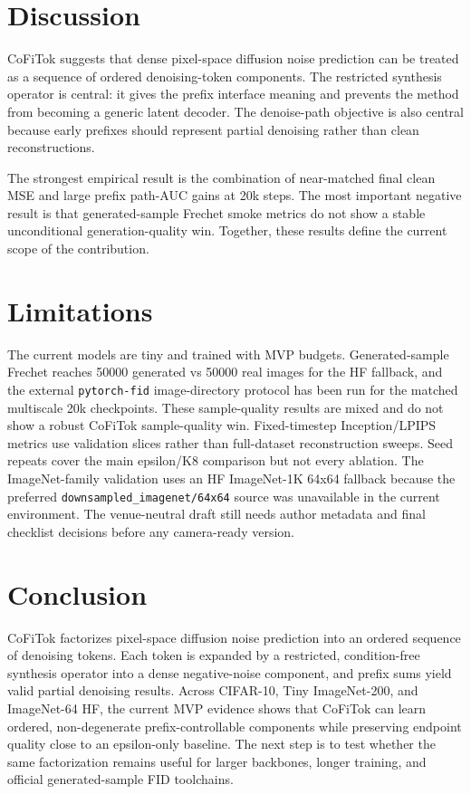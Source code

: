 \documentclass[11pt]{article}
\newcommand{\method}{CoFiTok}
\begin{document}
\section{Discussion}

\method{} suggests that dense pixel-space diffusion noise prediction can be
treated as a sequence of ordered denoising-token components. The restricted
synthesis operator is central: it gives the prefix interface meaning and
prevents the method from becoming a generic latent decoder. The denoise-path
objective is also central because early prefixes should represent partial
denoising rather than clean reconstructions.

The strongest empirical result is the combination of near-matched final clean
MSE and large prefix path-AUC gains at 20k steps. The most important negative
result is that generated-sample Frechet smoke metrics do not show a stable
unconditional generation-quality win. Together, these results define the
current scope of the contribution.

\section{Limitations}

The current models are tiny and trained with MVP budgets. Generated-sample
Frechet reaches 50000 generated vs 50000 real images for the HF fallback, and
the external \texttt{pytorch-fid} image-directory protocol has been run for the
matched multiscale 20k checkpoints. These sample-quality results are mixed and
do not show a robust \method{} sample-quality win. Fixed-timestep
Inception/LPIPS metrics use validation slices rather than full-dataset
reconstruction sweeps. Seed repeats cover the main epsilon/K8 comparison but
not every ablation. The ImageNet-family validation uses an HF ImageNet-1K 64x64
fallback because the preferred \texttt{downsampled\_imagenet/64x64} source was
unavailable in the current environment. The venue-neutral draft still needs
author metadata and final checklist decisions before any camera-ready version.

\section{Conclusion}

\method{} factorizes pixel-space diffusion noise prediction into an ordered
  sequence of denoising tokens. Each token is expanded by a restricted,
condition-free synthesis operator into a dense negative-noise component, and
prefix sums yield valid partial denoising results. Across CIFAR-10, Tiny
ImageNet-200, and ImageNet-64 HF, the current MVP evidence shows that \method{}
can learn ordered, non-degenerate prefix-controllable components while
preserving endpoint quality close to an epsilon-only baseline. The next step is
to test whether the same factorization remains useful for larger backbones,
longer training, and official generated-sample FID toolchains.



\end{document}
